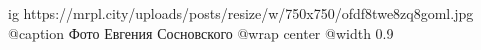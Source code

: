  
 
 
 
 

\ifcmt
  ig https://mrpl.city/uploads/posts/resize/w/750x750/ofdf8twe8zq8goml.jpg
	@caption Фото Евгения Сосновского
  @wrap center
  @width 0.9
\fi
